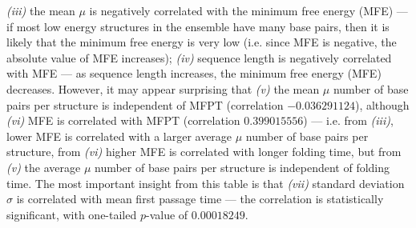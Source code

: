 \begin{landscape}
\begin{table}[!h]
{{\em (iii)}
the mean $\mu$ is negatively correlated with the
minimum free energy (MFE) --- if most low energy structures in the ensemble
have many base pairs, then it is likely that the minimum free energy is very
low (i.e. since MFE is negative, the absolute value of MFE increases);
{\em (iv)}
sequence length is negatively correlated with MFE --- as sequence length
increases, the minimum free energy (MFE) decreases.
However, it may appear surprising that
{\em (v)} the
mean $\mu$ number of base pairs per structure is independent of MFPT
(correlation $-0.036291124$), although
{\em (vi)} MFE is correlated with MFPT
(correlation $0.399015556$) --- i.e.  from {\em (iii)},
lower MFE is correlated with a larger average $\mu$ number of base pairs per
structure, from {\em (vi)}
higher MFE is correlated with longer folding time, but
from {\em (v)} the average $\mu$  number of base pairs per structure is
independent of folding time.
The most important insight from this table is that
{\em (vii)}
standard deviation $\sigma$ is correlated with mean first passage
time --- the correlation is statistically significant, with one-tailed
$p$-value of $0.00018249$.}
\label{table:correlationFFTborEmpty}
\end{table}
\end{landscape}

